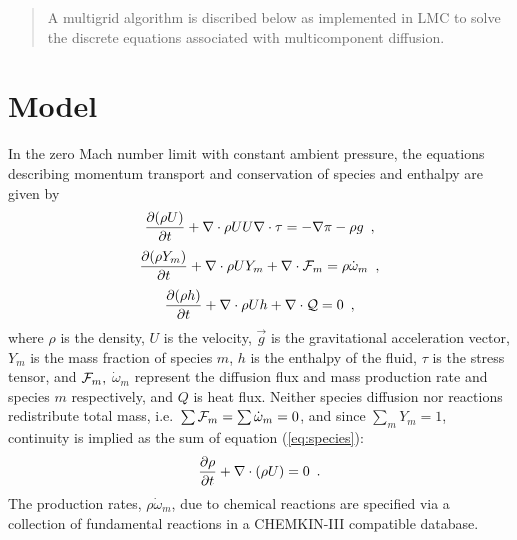 \documentclass[11pt]{article}
\begin{document}
\begin{abstract}
A multigrid algorithm is discribed below as implemented in LMC to solve the discrete equations
associated with multicomponent diffusion.
\end{abstract}

\newcommand{\gp}{{\vec \imath}}
\newcommand{\told}{{t^{n}}}
\newcommand{\tnew}{{t^{n+1}}}
\newcommand{\nua}{{\nu_1}}
\newcommand{\nub}{{\nu_2}}

\section{Model}
In the zero Mach number limit with constant ambient pressure,
the equations describing momentum transport
and conservation of species and enthalpy are given by
\begin{equation}
\frac{\partial (\rho U)}{\partial t} + \nabla \cdot \rho UU \nabla \cdot \tau = -\nabla \pi 
- \rho g \enskip , \label{eq:mom}
\end{equation}
\begin{equation}
\frac{\partial (\rho Y_m)}{\partial t} + \nabla \cdot \rho U Y_m + \nabla \cdot {\cal F}_m
= \rho \dot{\omega}_m \enskip , \label{eq:species}
\end{equation}
\begin{equation}
\frac{ \partial (\rho h)}{ \partial t} + \nabla \cdot \rho U h + \nabla \cdot {\cal Q} = 0 \enskip ,
\label{eq:enthalpy}
\end{equation}
where $\rho$ is the density, $U$ is the velocity, $\vec{g}$ is the
gravitational acceleration vector, $Y_m$ is the mass fraction of
species $m$, $h$ is the enthalpy of the fluid, $\tau$ is the stress
tensor, and ${\cal {F}}_m,$ $\dot{\omega}_m$ represent the diffusion
flux and mass production rate and species $m$ respectively, and $Q$ is
heat flux.  Neither species diffusion nor reactions redistribute total
mass, i.e.\ $\sum {\cal F}_{m} = \sum {\dot \omega}_{m} = 0$, and since
$\sum_{m} Y_m = 1$, continuity is implied as the sum of equation
(\ref{eq:species}):
\begin{equation}
\frac{\partial \rho}{\partial t} + \nabla \cdot  (\rho U) = 0 \enskip .
\label{eq:cont}
\end{equation}
The production rates, $\rho \dot{\omega}_m$, due to chemical reactions
are specified via a collection of fundamental reactions in a
CHEMKIN-III compatible database.%
\end{document}
